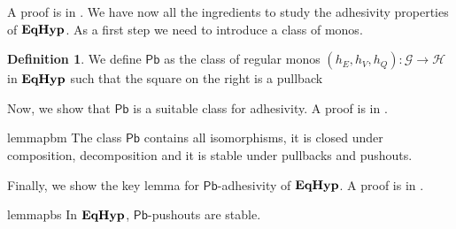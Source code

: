 \documentclass[a4paper,UKenglish,cleveref,pdftex,amsthm,thm-restate,numberwithinsect]{cas-sc}
\newcommand{\pbc}{\mathsf{Pb}}
\theoremstyle{plain}
\theoremstyle{definition}
\newtheorem{definition}[theorem]{Definition}
\newcommand{\catname}[1]{\textbf{\textup{#1}}}
\newcommand{\EqHyp}{\catname{EqHyp}} %
\begin{document}
A proof is in .
We have now all the ingredients to study the adhesivity properties of $\EqHyp$.  As a first step we need to introduce a class of monos.

\noindent
\parbox{11cm}{
\begin{definition}
	We define $\pbc$ as the class of  regular monos $(h_E, h_V, h_Q)\colon \mathcal{G}\to \mathcal{H}$ in $\EqHyp$ such that the square on the right is a pullback
\end{definition}
} \hfill
	\parbox{2cm}{
         }   

\vspace{.1cm}
Now, we show that $\pbc$ is a suitable class for adhesivity. A proof is in .

\begin{restatable}{lemma}{pbm}\label{lem:pbmono}
	The class $\pbc$ contains all isomorphisms, it is closed under composition, decomposition and it is stable under pullbacks and pushouts.
\end{restatable}

\vspace{.1cm}
Finally, we show the key lemma for $\pbc$-adhesivity of $\EqHyp$. A proof is in .

\begin{restatable}{lemma}{pbs}\label{lemma:stab}
	In $\EqHyp$, $\pbc$-pushouts are stable.
\end{restatable}
\end{document}
